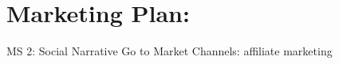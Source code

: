 \section{Marketing Plan:}

MS 2: 
Social Narrative
Go to Market Channels: 
    affiliate marketing
    
    







